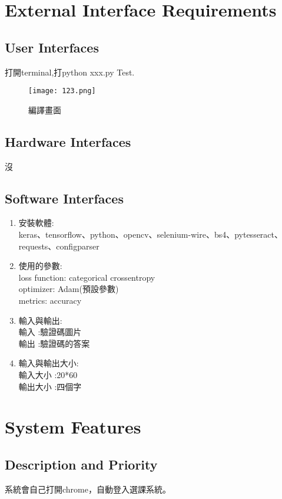 \documentclass{scrreprt}
\begin{document}
\begin{CJK}{UTF8}{nkai}
\chapter{External Interface Requirements}

\section{User Interfaces}
\setlength{\parindent}{1.5em}打開terminal,打python xxx.py
Test.
\begin{figure}[h]
\begin{center}
\texttt{[image: 123.png]}
\end{center}
\caption{編譯畫面}
\label{fig:1}
\end{figure}
\section{Hardware Interfaces}
沒
\section{Software Interfaces}
\begin{enumerate}
  \item  安裝軟體:\\
         keras、tensorflow、python、opencv、selenium-wire、bs4、pytesseract、requests、configparser
  \item  使用的參數:\\
loss function: categorical crossentropy\\
       optimizer: Adam(預設參數)\\
       metrics: accuracy\\
  \item  輸入與輸出:\\
 輸入 :驗證碼圖片\\
       輸出 :驗證碼的答案\\
  \item  輸入與輸出大小:\\
 輸入大小 :20*60\\
       輸出大小 :四個字\\
\end{enumerate}


\chapter{System Features}

\section{Description and Priority}
\setlength{\parindent}{1.5em}系統會自己打開chrome，自動登入選課系統。

\end{CJK}
\end{document}
